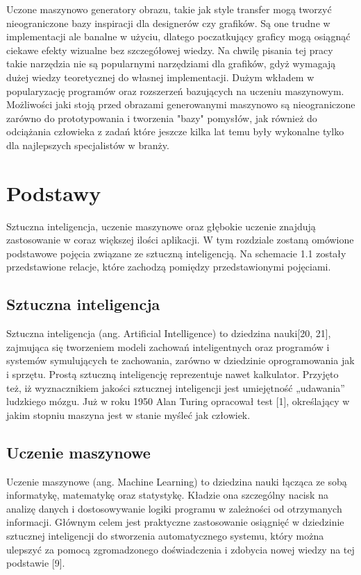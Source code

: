 \documentclass[brudnopis]{xmgr}
\begin{document}
 Uczone maszynowo generatory obrazu, takie jak style transfer mogą tworzyć nieograniczone bazy inspiracji dla designerów czy grafików. Są one trudne w implementacji ale banalne w użyciu, dlatego poczatkujący graficy mogą osiągnąć ciekawe efekty wizualne bez szczegółowej wiedzy. Na chwilę pisania tej pracy takie narzędzia nie są popularnymi narzędziami dla grafików, gdyż wymagają dużej wiedzy teoretycznej do własnej implementacji. Dużym wkładem w popularyzację programów oraz rozszerzeń bazujących na uczeniu maszynowym. Możliwości jaki stoją przed obrazami generowanymi maszynowo są nieograniczone zarówno do prototypowania i tworzenia "bazy" pomysłów, jak również do odciążania człowieka z zadań które jeszcze kilka lat temu były wykonalne tylko dla najlepszych specjalistów w branży.


\chapter{Podstawy\label{s:dtd}}

Sztuczna inteligencja, uczenie maszynowe oraz głębokie uczenie znajdują zastosowanie w coraz większej ilości aplikacji. W tym rozdziale zostaną omówione podstawowe pojęcia związane ze sztuczną inteligencją. Na schemacie 1.1 zostały przedstawione relacje, które zachodzą pomiędzy przedstawionymi pojęciami.

\section{Sztuczna inteligencja}

Sztuczna inteligencja (ang. Artificial Intelligence) to dziedzina nauki[20, 21], zajmująca się tworzeniem modeli zachowań inteligentnych oraz programów i systemów symulujących te zachowania, zarówno w dziedzinie oprogramowania jak i sprzętu. Prostą sztuczną inteligencję reprezentuje nawet kalkulator. Przyjęto też, iż wyznacznikiem jakości sztucznej inteligencji jest umiejętność „udawania” ludzkiego mózgu. Już w roku 1950 Alan Turing opracował test [1], określający w jakim stopniu maszyna jest w stanie myśleć jak człowiek.



\section{Uczenie maszynowe}

Uczenie maszynowe (ang. Machine Learning) to dziedzina nauki łącząca ze sobą informatykę, matematykę oraz statystykę. Kładzie ona szczególny nacisk na analizę danych i dostosowywanie logiki programu w zależności od otrzymanych informacji. Głównym celem jest praktyczne zastosowanie osiągnięć w dziedzinie sztucznej inteligencji do stworzenia automatycznego systemu, który można ulepszyć za pomocą zgromadzonego doświadczenia i zdobycia nowej wiedzy na tej podstawie [9].
\end{document}
